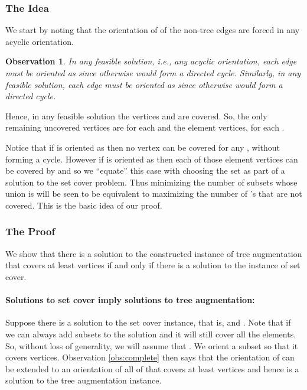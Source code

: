 \documentclass{article}
\newtheorem{obs}[theorem]{Observation}
\begin{document}
\subsubsection*{The Idea}
We start by noting that the orientation of  of the non-tree edges are forced in any acyclic orientation.
\begin{obs}\label{obs:forced}
In any feasible solution, i.e., any acyclic orientation, each edge  must
be oriented as  since otherwise  would form a directed cycle.
Similarly, in any feasible solution, each edge  must be oriented as  since otherwise  would form a directed cycle.
\end{obs}
Hence, in any feasible solution the  vertices  and  are covered.
So, the only remaining uncovered vertices are  for each  and the element vertices,  for each .

Notice that if  is oriented as  then no vertex  can
be covered for any ,  without forming a cycle.
However if  is oriented as  then each of those element vertices  can be covered by  and so we ``equate'' this case with choosing the set  as part of a solution to the set cover problem.
Thus minimizing the number of subsets  whose union is  will be seen
to be equivalent to maximizing the number of 's that are not covered.
This is the basic idea of our proof. 

\subsubsection*{The Proof}

  We show that there is a solution to the constructed instance of {\sc
    tree augmentation} that covers at least  vertices if and only
  if there is a solution to the instance of {\sc set cover}.

\paragraph{Solutions to {\sc set cover} imply solutions to {\sc tree
  augmentation}:}
  
Suppose there is a solution  to the {\sc
  set cover} instance, that is,  and .  Note that if  we can always
add subsets to the solution and it will still cover all the elements.
So, without loss of generality, we will assume that .
We orient a subset  so that it covers  vertices. Observation \ref{obs:complete} then says that the orientation of  can
be extended to an orientation of all of  that covers at least  vertices and
hence is a solution to the {\sc tree augmentation} instance.
\end{document}
